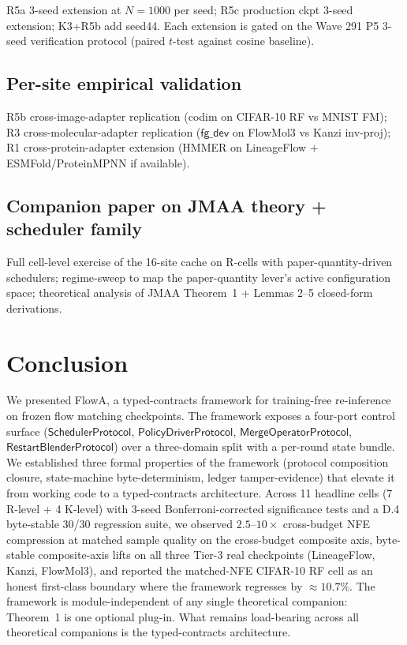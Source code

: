 \documentclass[journal,twocolumn,final]{IEEEtran}
\begin{document}
R5a 3-seed extension at $N = 1000$ per seed; R5c production ckpt 3-seed
extension; K3+R5b add seed44. Each extension is gated on the Wave 291 P5
3-seed verification protocol (paired $t$-test against cosine baseline).

\subsection*{Per-site empirical validation}

R5b cross-image-adapter replication (codim on CIFAR-10 RF vs MNIST FM); R3
cross-molecular-adapter replication ($\mathsf{fg\_dev}$ on FlowMol3 vs Kanzi
inv-proj); R1 cross-protein-adapter extension (HMMER on LineageFlow +
ESMFold/ProteinMPNN if available).

\subsection*{Companion paper on JMAA theory + scheduler family}

Full cell-level exercise of the 16-site cache on R-cells with
paper-quantity-driven schedulers; regime-sweep to map the paper-quantity
lever's active configuration space; theoretical analysis of JMAA Theorem~1 +
Lemmas 2--5 closed-form derivations.

\section{Conclusion}\label{sec:conclusion}

We presented FlowA, a typed-contracts framework for training-free re-inference
on frozen flow matching checkpoints. The framework exposes a four-port control
surface ($\mathsf{SchedulerProtocol}$, $\mathsf{PolicyDriverProtocol}$,
$\mathsf{MergeOperatorProtocol}$, $\mathsf{RestartBlenderProtocol}$) over a
three-domain split with a per-round state bundle. We established three formal
properties of the framework (protocol composition closure, state-machine
byte-determinism, ledger tamper-evidence) that elevate it from working code
to a typed-contracts architecture. Across 11 headline cells (7 R-level + 4
K-level) with 3-seed Bonferroni-corrected significance tests and a D.4
byte-stable 30/30 regression suite, we observed $2.5$--$10\times$ cross-budget
NFE compression at matched sample quality on the cross-budget composite axis,
byte-stable composite-axis lifts on all three Tier-3 real checkpoints
(LineageFlow, Kanzi, FlowMol3), and reported the matched-NFE CIFAR-10 RF cell
as an honest first-class boundary where the framework regresses by $\approx
10.7\%$. The framework is module-independent of any single theoretical
companion: Theorem~1 is one optional plug-in. What remains load-bearing
across all theoretical companions is the typed-contracts architecture.
\end{document}
